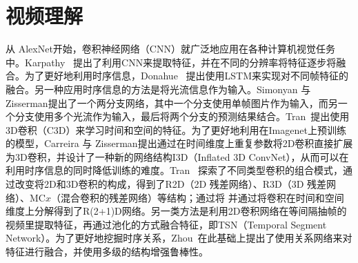 \section{视频理解}
从 AlexNet\cite{krizhevsky2012imagenet}开始，卷积神经网络（CNN）就广泛地应用在各种计算机视觉任务中。Karpathy~\etal\cite{karpathy2014large} 提出了利用CNN来提取特征，并在不同的分辨率将特征逐步将融合。为了更好地利用时序信息，Donahue~\etal\cite{donahue2015long} 提出使用LSTM来实现对不同帧特征的融合。另一种应用时序信息的方法是将光流信息作为输入。Simonyan 与 Zisserman\cite{simonyan2014two}提出了一个两分支网络，其中一个分支使用单帧图片作为输入，而另一个分支使用多个光流作为输入，最后将两个分支的预测结果结合。Tran~\etal\cite{tran2015learning}提出使用3D卷积（C3D）来学习时间和空间的特征。为了更好地利用在Imagenet\cite{deng2009imagenet}上预训练的模型，Carreira 与 Zisserman\cite{carreira2017quo}提出通过在时间维度上重复参数将2D卷积直接扩展为3D卷积，并设计了一种新的网络结构I3D（Inflated 3D ConvNet），从而可以在利用时序信息的同时降低训练的难度。Tran~\etal\cite{tran2018closer} 探索了不同类型卷积的组合模式，通过改变将2D和3D卷积的构成，得到了R2D（2D 残差网络）、R3D（3D 残差网络）、MC$x$（混合卷积的残差网络）等结构；通过将
并通过将卷积在时间和空间维度上分解得到了R(2+1)D网络。另一类方法是利用2D卷积网络在等间隔抽帧的视频里提取特征，再通过池化的方式融合特征，即TSN\cite{wang2016temporal}（Temporal Segment Network）。为了更好地挖掘时序关系，Zhou~\etal 在此基础上提出了使用关系网络来对特征进行融合，并使用多级的结构增强鲁棒性。

